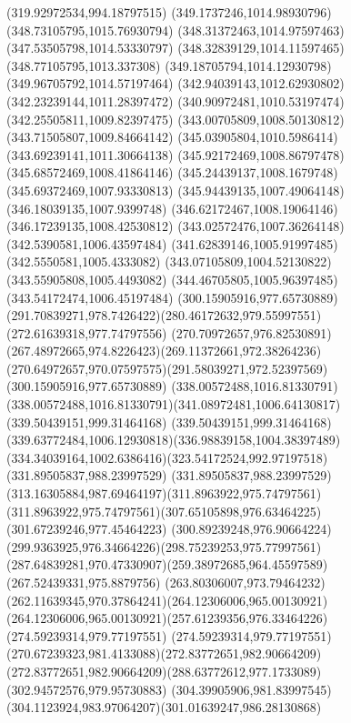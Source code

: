 {{\lineto(319.92972534,994.18797515)
\closepath
\moveto(349.1737246,1014.98930796)
\lineto(348.73105795,1015.76930794)
\lineto(348.31372463,1014.97597463)
\lineto(347.53505798,1014.53330797)
\lineto(348.32839129,1014.11597465)
\lineto(348.77105795,1013.337308)
\lineto(349.18705794,1014.12930798)
\lineto(349.96705792,1014.57197464)
\closepath
\moveto(342.94039143,1012.62930802)
\lineto(342.23239144,1011.28397472)
\lineto(340.90972481,1010.53197474)
\lineto(342.25505811,1009.82397475)
\lineto(343.00705809,1008.50130812)
\lineto(343.71505807,1009.84664142)
\lineto(345.03905804,1010.5986414)
\lineto(343.69239141,1011.30664138)
\closepath
\moveto(345.92172469,1008.86797478)
\lineto(345.68572469,1008.41864146)
\lineto(345.24439137,1008.1679748)
\lineto(345.69372469,1007.93330813)
\lineto(345.94439135,1007.49064148)
\lineto(346.18039135,1007.9399748)
\lineto(346.62172467,1008.19064146)
\lineto(346.17239135,1008.42530812)
\closepath
\moveto(343.02572476,1007.36264148)
\lineto(342.5390581,1006.43597484)
\lineto(341.62839146,1005.91997485)
\lineto(342.5550581,1005.4333082)
\lineto(343.07105809,1004.52130822)
\lineto(343.55905808,1005.4493082)
\lineto(344.46705805,1005.96397485)
\lineto(343.54172474,1006.45197484)
\closepath
\moveto(300.15905916,977.65730889)
\curveto(291.70839271,978.7426422)(280.46172632,979.55997551)(272.61639318,977.74797556)
\curveto(270.70972657,976.82530891)(267.48972665,974.8226423)(269.11372661,972.38264236)
\curveto(270.64972657,970.07597575)(291.58039271,972.52397569)(300.15905916,977.65730889)
\moveto(338.00572488,1016.81330791)
\curveto(338.00572488,1016.81330791)(341.08972481,1006.64130817)(339.50439151,999.31464168)
\curveto(339.50439151,999.31464168)(339.63772484,1006.12930818)(336.98839158,1004.38397489)
\curveto(334.34039164,1002.6386416)(323.54172524,992.97197518)(331.89505837,988.23997529)
\curveto(331.89505837,988.23997529)(313.16305884,987.69464197)(311.8963922,975.74797561)
\curveto(311.8963922,975.74797561)(307.65105898,976.63464225)(301.67239246,977.45464223)
\curveto(300.89239248,976.90664224)(299.9363925,976.34664226)(298.75239253,975.77997561)
\curveto(287.64839281,970.47330907)(259.38972685,964.45597589)(267.52439331,975.8879756)
\curveto(263.80306007,973.79464232)(262.11639345,970.37864241)(264.12306006,965.00130921)
\curveto(264.12306006,965.00130921)(257.61239356,976.33464226)(274.59239314,979.77197551)
\curveto(274.59239314,979.77197551)(270.67239323,981.4133088)(272.83772651,982.90664209)
\curveto(272.83772651,982.90664209)(288.63772612,977.1733089)(302.94572576,979.95730883)
\curveto(304.39905906,981.83997545)(304.1123924,983.97064207)(301.01639247,986.28130868)
}}
